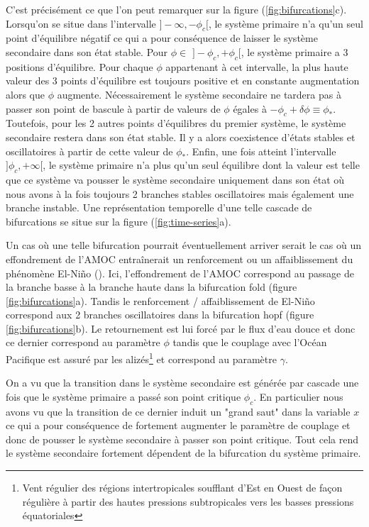 C'est précisément ce que l'on peut remarquer sur la figure (\ref{fig:bifurcations}c). Lorsqu'on se situe dans l'intervalle $]-\infty, -\phi_c[$, le système primaire n'a qu'un seul point d'équilibre négatif ce qui a pour conséquence de laisser le système secondaire dans son état stable. Pour $\phi \in$ $]-\phi_c, +\phi_c[$, le système primaire a 3 positions d'équilibre. Pour chaque $\phi$ appartenant à cet intervalle, la plus haute valeur des 3 points d'équilibre est toujours positive et en constante augmentation alors que $\phi$ augmente. Nécessairement le système secondaire ne tardera pas à passer son point de bascule à partir de valeurs de $\phi$ égales à $-\phi_c + \delta \phi \equiv \phi_{\ast}$. Toutefois, pour les 2 autres points d'équilibres du premier système, le système secondaire restera dans son état stable. Il y a alors coexistence d'états stables et oscillatoires à partir de cette valeur de $\phi_{\ast}$. Enfin, une fois atteint l'intervalle $]\phi_c, +\infty[$, le système primaire n'a plus qu'un seul équilibre dont la valeur est telle que ce système va pousser le système secondaire uniquement dans son état où nous avons à la fois toujours 2 branches stables oscillatoires mais également une branche instable. Une représentation temporelle d'une telle cascade de bifurcations se situe sur la figure (\ref{fig:time-series}a).

Un cas où une telle bifurcation pourrait éventuellement arriver serait le cas où un effondrement de l'AMOC entraînerait un renforcement ou un affaiblissement du phénomène El-Niño (\cite{timmermann_influence_2007}). Ici, l'effondrement de l'AMOC correspond au passage de la branche basse à la branche haute dans la bifurcation fold (figure \ref{fig:bifurcations}a). Tandis le renforcement / affaiblissement de El-Niño correspond aux 2 branches oscillatoires dans la bifurcation hopf (figure \ref{fig:bifurcations}b). Le retournement est lui forcé par le flux d'eau douce et donc ce dernier correspond au paramètre $\phi$ tandis que le couplage avec l'Océan Pacifique est assuré par les alizés\footnote{Vent régulier des régions intertropicales soufflant d'Est en Ouest de façon régulière à partir des hautes pressions subtropicales vers les basses pressions équatoriales} et correspond au paramètre $\gamma$.


On a vu que la transition dans le système secondaire est générée par cascade une fois que le système primaire a passé son point critique $\phi_c$. En particulier nous avons vu que la transition de ce dernier induit un "grand saut" dans la variable $x$ ce qui a pour conséquence de fortement augmenter le paramètre de couplage et donc de pousser le système secondaire à passer son point critique. Tout cela rend le système secondaire fortement dépendent de la bifurcation du système primaire.

